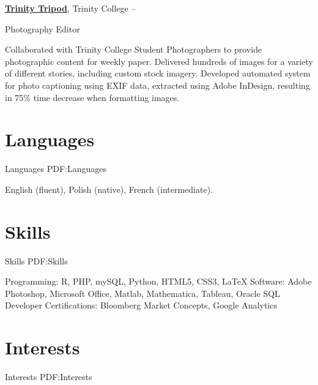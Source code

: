 \documentclass[letterpaper,10pt,oneside]{article}
\begin{document}
\begin{body}
\BigGapNoBreak
\href{http://commons.trincoll.edu/tripod}
{\textbf{Trinity Tripod}},
Trinity College
\hfill
{} --

\GapNoBreak
\BulletItem
Photography Editor
\begin{detail}
\SubBulletItem
Collaborated with Trinity College Student Photographers to provide photographic content for weekly paper.
\SubBulletItem
Delivered hundreds of images for a variety of different stories, including custom stock imagery.
\SubBulletItem
Developed automated system for photo captioning using EXIF data, extracted using Adobe InDesign, resulting in 75\% time decrease when formatting images.
\end{detail}


\noindent\hrulefill
\section
{Languages}
{Languages}
{PDF:Languages}

English (fluent), Polish (native), French (intermediate).

\begin{comment}
\BulletItem
English: Fluent (speaking, reading, writing).

\GapNoBreak
\BulletItem
Polish: Native language.

\GapNoBreak
\BulletItem
French: Intermediate (speaking, reading, writing).
\end{comment}



\section
{Skills}
{Skills}
{PDF:Skills}

Programming: R, PHP, mySQL, Python, HTML5, CSS3, \LaTeX \hfill\break
Software: Adobe Photoshop, Microsoft Office, Matlab, Mathematica, Tableau, Oracle SQL Developer\hfill\break
Certifications: Bloomberg Market Concepts, Google Analytics



\section
{Interests}
{Interests}
{PDF:Interests}


\end{body}
\end{document}
